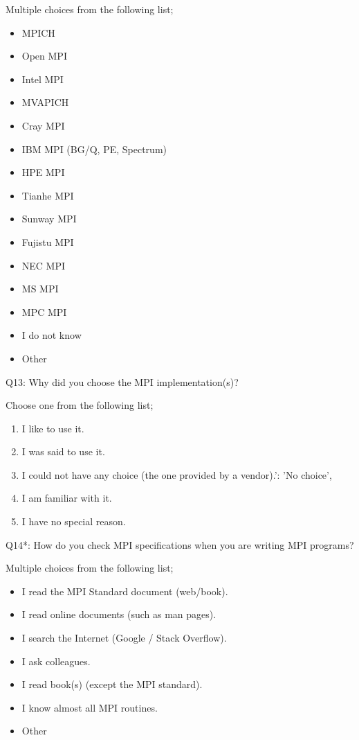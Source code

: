 \begin{description}
Multiple choices from the following list;
\begin{itemize}
\item MPICH
\item Open MPI
\item Intel MPI
\item MVAPICH
\item Cray MPI
\item IBM MPI (BG/Q, PE, Spectrum)
\item HPE MPI
\item Tianhe MPI
\item Sunway MPI
\item Fujistu MPI
\item NEC MPI
\item MS MPI
\item MPC MPI
\item I do not know
\item Other
\end{itemize}

\item{Q13:} Why did you choose the MPI implementation(s)?

Choose one from the following list;
\begin{enumerate}
\item I like to use it.
\item I was said to use it.
\item I could not have any choice (the one provided by a vendor).': 'No choice',
\item I am familiar with it.
\item I have no special reason.
\end{enumerate}

\item{Q14*:} How do you check MPI specifications when you are writing MPI programs?

Multiple choices from the following list;
\begin{itemize}
\item I read the MPI Standard document (web/book).
\item I read online documents (such as man pages).
\item I search the Internet (Google / Stack Overflow).
\item I ask colleagues.
\item I read book(s) (except the MPI standard).
\item I know almost all MPI routines.
\item Other
\end{itemize}


\end{description}
